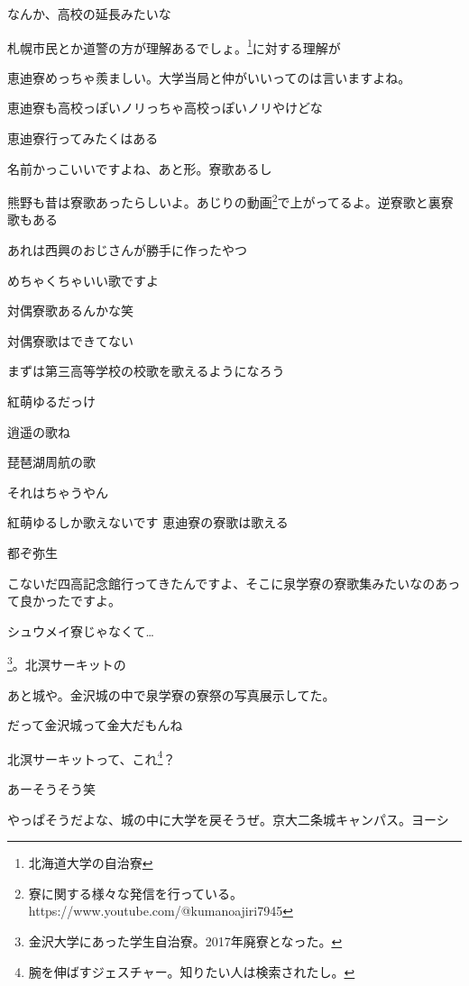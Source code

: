 \begin{multicols}{3}
なんか、高校の延長みたいな

札幌市民とか道警の方が理解あるでしょ。\footnote{北海道大学の自治寮}に対する理解が

恵迪寮めっちゃ羨ましい。大学当局と仲がいいってのは言いますよね。

恵迪寮も高校っぽいノリっちゃ高校っぽいノリやけどな

恵迪寮行ってみたくはある

名前かっこいいですよね、あと形。寮歌あるし

熊野も昔は寮歌あったらしいよ。あじりの動画\footnote{寮に関する様々な発信を行っている。https://www.youtube.com/@kumanoajiri7945}で上がってるよ。逆寮歌と裏寮歌もある

あれは西興のおじさんが勝手に作ったやつ

めちゃくちゃいい歌ですよ

対偶寮歌あるんかな笑

対偶寮歌はできてない

まずは第三高等学校の校歌を歌えるようになろう

紅萌ゆるだっけ

逍遥の歌ね

琵琶湖周航の歌

それはちゃうやん

紅萌ゆるしか歌えないです 恵迪寮の寮歌は歌える

都ぞ弥生

こないだ四高記念館行ってきたんですよ、そこに泉学寮の寮歌集みたいなのあって良かったですよ。

シュウメイ寮じゃなくて…

\footnote{金沢大学にあった学生自治寮。2017年廃寮となった。}。北溟サーキットの

あと城や。金沢城の中で泉学寮の寮祭の写真展示してた。

だって金沢城って金大だもんね

北溟サーキットって、これ\footnote{腕を伸ばすジェスチャー。知りたい人は検索されたし。}？

あーそうそう笑

やっぱそうだよな、城の中に大学を戻そうぜ。京大二条城キャンパス。ヨーシ


\end{multicols}
